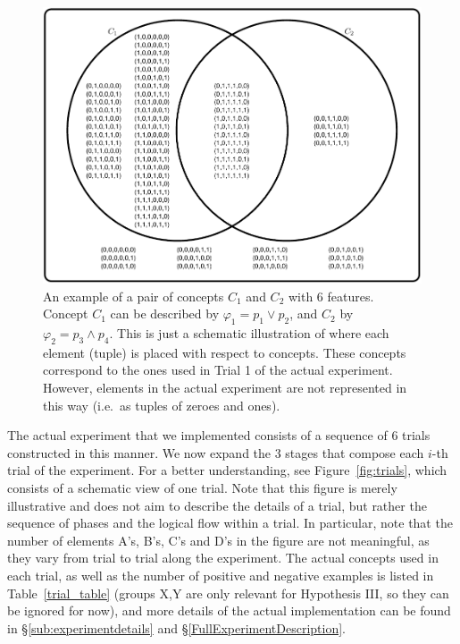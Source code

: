 \begin{figure}
\begin{center}
	\includegraphics[scale=.65]{papers/images_behavior_research_methods/twoconcepts3.pdf}
\end{center}\caption{An example of a pair of concepts $C_1$ and $C_2$ with 6 features. Concept $C_1$ can be described by $\varphi_1=p_1 \lor p_2$, and $C_2$ by $\varphi_2=p_3\land p_4$. This is just a schematic illustration of where each element (tuple) is placed with respect to concepts. These concepts correspond to the ones used in Trial 1 of the actual experiment. However, elements in the actual experiment are not represented in this way (i.e.\ as tuples of zeroes and ones).
}
\label{fig:twoconcepts}
\end{figure} 

The actual experiment that we implemented consists of a sequence of 6 trials constructed in this manner. We now expand the 3 stages that compose each $i$-th trial of the experiment. For a better understanding, see Figure~\ref{fig:trials}, which consists of a schematic view of one trial. Note that this figure is merely illustrative and does not aim to describe the details of a trial, but rather the sequence of phases and the logical flow within a trial. In particular, note that the number of elements {\sf A}'s, {\sf B}'s, {\sf C}'s and {\sf D}'s in the figure are not meaningful, as they vary from trial to trial along the experiment. The actual concepts used in each trial, as well as the number of positive and negative examples is listed in Table~\ref{trial_table} (groups X,Y are only relevant for Hypothesis III, so they can be ignored for now), and more details of the actual implementation can be found in \S\ref{sub:experimentdetails} and \S\ref{FullExperimentDescription}.
  
